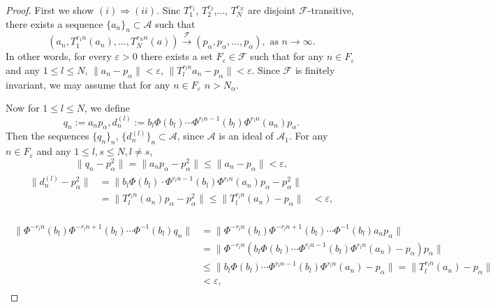 \documentclass[10pt,a4paper]{amsart}
\begin{document}
\begin{proof}
First we show $(i)\Rightarrow(ii)$. Sinc $T^{r_{1}}_{1}$, $T^{r_{2}}_{2}$,..., $T^{r_{N}}_{N}$ are disjoint $\mathcal{F}$-transitive, there exists a sequence $\{a_{n}\}_{n}\subset \mathcal{A}$ such that 
\[(a_{n}, T^{r_{1}n}_{1}(a_{n}),..., T^{r_{N}n}_{N}(a))\stackrel{\mathcal F}{\longrightarrow} (p_{\alpha}, p_{\alpha},..., p_{\alpha}), \textrm{ as } n\rightarrow \infty.\]
In other words, for every $\varepsilon>0$ there exists a set $F_{\varepsilon}\in \mathcal{F}$ such that for any $n\in F_{\varepsilon}$ and any $1\leq l\leq N$, $\|a_{n}-p_{\alpha}\|<\varepsilon$, $\|T^{r_{l}n}_{l}a_{n}-p_{\alpha}\|<\varepsilon$.
Since $\mathcal{F}$ is finitely invariant, we may assume that for any $n\in F_{\varepsilon}$ $n>N_{\alpha}$. 

Now for $1\leq l\leq N$, we define 
\[q_{n}:=a_{n}p_{\alpha}, d^{(l)}_{n}:=b_{l}\Phi(b_{l})\cdots\Phi^{r_{l}n-1}(b_{l})\Phi^{r_{l}n}(a_{n})p_{\alpha}.\]
Then the sequences $\{q_{n}\}_{n}$, $\{d^{(l)}_{n}\}_{n}\subset \mathcal{A}$, since $\mathcal{A}$ is an ideal of $\mathcal{A}_{1}$. For any $n\in F_{\varepsilon}$ and any $1\leq l, s\leq N, l\neq s$,
\[\|q_{n}-p^{2}_{\alpha}\|=\|a_{n}p_{\alpha}-p^{2}_{\alpha}\|\leq \|a_{n}-p_{\alpha}\|<\varepsilon,\]
\begin{eqnarray}\begin{split}\nonumber
\|d^{(l)}_{n}-p^{2}_{\alpha}\|&=\|b_{l}\Phi(b_{l})\cdot\Phi^{r_{l}n-1}(b_{l})\Phi^{r_{l}n}(a_{n})p_{\alpha}-p^{2}_{\alpha}\|
\\
&=\|T^{r_{l}n}_{l}(a_{n})p_{\alpha}-p^{2}_{\alpha}\|\leq \|T^{r_{l}n}_{l}(a_{n})-p_{\alpha}\|
&<\varepsilon,
\end{split}
\end{eqnarray}

\begin{eqnarray}\begin{split}\nonumber
\|\Phi^{-r_{l}n}(b_{l})\Phi^{-r_{l}n+1}(b_{l})\cdots \Phi^{-1}(b_{l})q_{n}\|&=\|\Phi^{-r_{l}n}(b_{l})\Phi^{-r_{l}n+1}(b_{l})\cdots \Phi^{-1}(b_{l})a_{n}p_{\alpha}\|
\\
&=\|\Phi^{-r_{l}n}(b_{l}\Phi(b_{l})\cdots \Phi^{r_{l}n-1}(b_{l})\Phi^{r_{l}n}(a_{n})-p_{\alpha})p_{\alpha}\|
\\
&\leq \|b_{l}\Phi(b_{l})\cdots \Phi^{r_{l}n-1}(b_{l})\Phi^{r_{l}n}(a_{n})-p_{\alpha}\|=\|T^{r_{l}n}_{l}(a_{n})-p_{\alpha}\|
\\
&<\varepsilon,
\end{split}
\end{eqnarray}


\end{proof}
\end{document}
